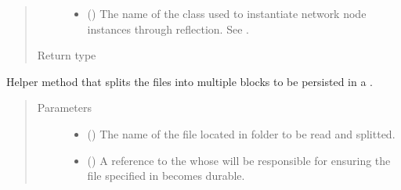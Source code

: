 \documentclass[letterpaper,10pt,english]{sphinxmanual}
\begin{document}
\begin{fulllineitems}
\begin{fulllineitems}
\begin{quote}
\begin{description}
\begin{itemize}
\item {} 
 () \textendash{} The name of the class used to instantiate network node
instances through reflection.
See {\hyperref[\detokenize{app.domain:module-app.domain.network_nodes}]{}}.

\end{itemize}

\item[{Return type}] \leavevmode
{}

\end{description}\end{quote}

\end{fulllineitems}


\begin{fulllineitems}
\label{\detokenize{app.domain:app.domain.master_servers.Master._split_files}}
Helper method that splits the files into multiple blocks to be
persisted in a {\hyperref[\detokenize{app.domain:app.domain.cluster_groups.Cluster}]{}}.
\begin{quote}\begin{description}
\item[{Parameters}] \leavevmode\begin{itemize}
\item {} 
 () \textendash{} The name of the file located in
{\hyperref[\detokenize{app:app.environment_settings.SHARED_ROOT}]{}} folder to be
read and splitted.

\item {} 
 ({\hyperref[\detokenize{app:app.type_hints.ClusterType}]{}}) \textendash{} A reference to the {\hyperref[\detokenize{app.domain:app.domain.cluster_groups.Cluster}]{}} whose
{\hyperref[\detokenize{app.domain:app.domain.cluster_groups.Cluster.members}]{}} will be
responsible for ensuring the file specified in 
becomes durable.


\end{itemize}
\end{description}
\end{quote}
\end{fulllineitems}
\end{fulllineitems}
\end{document}
